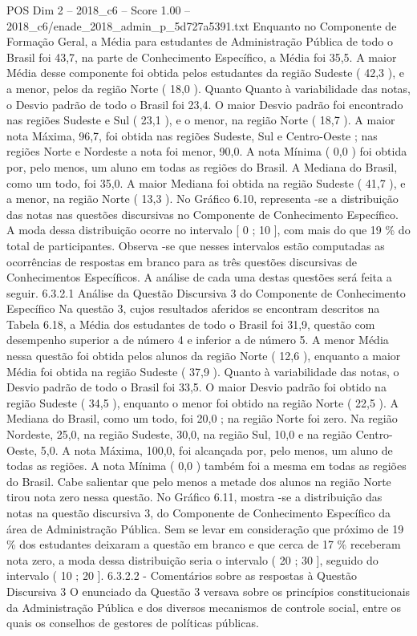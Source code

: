 \begin{textsample}{POS Dim 2 – 2018\_c6 – Score 1.00 – 2018\_c6/enade\_2018\_admin\_p\_5d727a5391.txt}
Enquanto no Componente de Formação Geral, a Média para estudantes de Administração Pública de todo o Brasil foi 43,7, na parte de Conhecimento Específico, a Média foi 35,5.
A maior Média desse componente foi obtida pelos estudantes da região Sudeste ( 42,3 ), e a menor, pelos da região Norte ( 18,0 ).
Quanto Quanto à variabilidade das notas, o Desvio padrão de todo o Brasil foi 23,4.
O maior Desvio padrão foi encontrado nas regiões Sudeste e Sul ( 23,1 ), e o menor, na região Norte ( 18,7 ).
A maior nota Máxima, 96,7, foi obtida nas regiões Sudeste, Sul e Centro-Oeste ; nas regiões Norte e Nordeste a nota foi menor, 90,0.
A nota Mínima ( 0,0 ) foi obtida por, pelo menos, um aluno em todas as regiões do Brasil.
A Mediana do Brasil, como um todo, foi 35,0.
A maior Mediana foi obtida na região Sudeste ( 41,7 ), e a menor, na região Norte ( 13,3 ).
No Gráfico 6.10, representa -se a distribuição das notas nas questões discursivas no Componente de Conhecimento Específico.
A moda dessa distribuição ocorre no intervalo [ 0 ; 10 ], com mais do que 19 \% do total de participantes.
Observa -se que nesses intervalos estão computadas as ocorrências de respostas em branco para as três questões discursivas de Conhecimentos Específicos.
A análise de cada uma destas questões será feita a seguir. 6.3.2.1 Análise da Questão Discursiva 3 do Componente de Conhecimento Específico Na questão 3, cujos resultados aferidos se encontram descritos na Tabela 6.18, a Média dos estudantes de todo o Brasil foi 31,9, questão com desempenho superior a de número 4 e inferior a de número 5.
A menor Média nessa questão foi obtida pelos alunos da região Norte ( 12,6 ), enquanto a maior Média foi obtida na região Sudeste ( 37,9 ).
Quanto à variabilidade das notas, o Desvio padrão de todo o Brasil foi 33,5.
O maior Desvio padrão foi obtido na região Sudeste ( 34,5 ), enquanto o menor foi obtido na região Norte ( 22,5 ).
A Mediana do Brasil, como um todo, foi 20,0 ; na região Norte foi zero.
Na região Nordeste, 25,0, na região Sudeste, 30,0, na região Sul, 10,0 e na região Centro-Oeste, 5,0.
A nota Máxima, 100,0, foi alcançada por, pelo menos, um aluno de todas as regiões.
A nota Mínima ( 0,0 ) também foi a mesma em todas as regiões do Brasil.
Cabe salientar que pelo menos a metade dos alunos na região Norte tirou nota zero nessa questão.
No Gráfico 6.11, mostra -se a distribuição das notas na questão discursiva 3, do Componente de Conhecimento Específico da área de Administração Pública.
Sem se levar em consideração que próximo de 19 \% dos estudantes deixaram a questão em branco e que cerca de 17 \% receberam nota zero, a moda dessa distribuição seria o intervalo ( 20 ; 30 ], seguido do intervalo ( 10 ; 20 ]. 6.3.2.2 - Comentários sobre as respostas à Questão Discursiva 3 O enunciado da Questão 3 versava sobre os princípios constitucionais da Administração Pública e dos diversos mecanismos de controle social, entre os quais os conselhos de gestores de políticas públicas.

\end{textsample}
